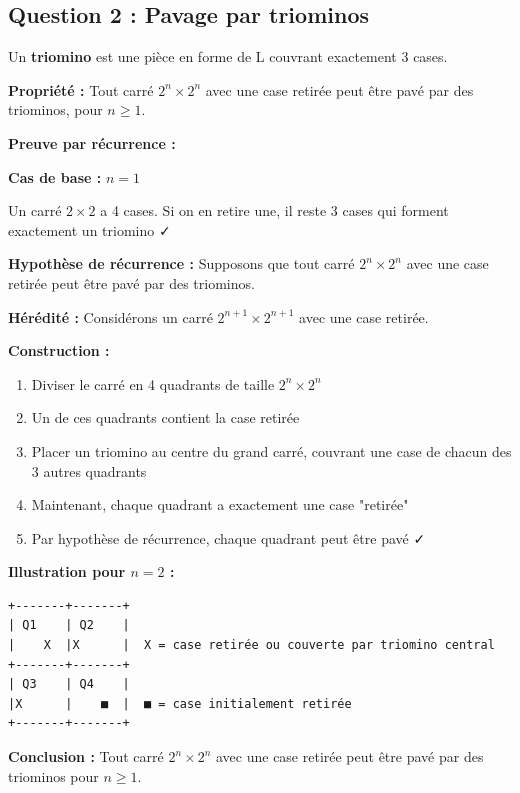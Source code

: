 \documentclass[12pt,a4paper]{article}
\begin{document}
\subsection{Question 2 : Pavage par triominos}

\begin{remarque}
Un \textbf{triomino} est une pièce en forme de L couvrant exactement 3 cases.
\end{remarque}

\begin{demonstration}
\textbf{Propriété :} Tout carré $2^n \times 2^n$ avec une case retirée peut être pavé par des triominos, pour $n \geq 1$.

\textbf{Preuve par récurrence :}

\textbf{Cas de base :} $n = 1$

Un carré $2 \times 2$ a 4 cases. Si on en retire une, il reste 3 cases qui forment exactement un triomino ✓

\textbf{Hypothèse de récurrence :} Supposons que tout carré $2^n \times 2^n$ avec une case retirée peut être pavé par des triominos.

\textbf{Hérédité :} Considérons un carré $2^{n+1} \times 2^{n+1}$ avec une case retirée.

\textbf{Construction :}
\begin{enumerate}
    \item Diviser le carré en 4 quadrants de taille $2^n \times 2^n$
    \item Un de ces quadrants contient la case retirée
    \item Placer un triomino au centre du grand carré, couvrant une case de chacun des 3 autres quadrants
    \item Maintenant, chaque quadrant a exactement une case "retirée"
    \item Par hypothèse de récurrence, chaque quadrant peut être pavé ✓
\end{enumerate}

\textbf{Illustration pour $n=2$ :}
\begin{verbatim}
+-------+-------+
| Q1    | Q2    |
|    X  |X      |  X = case retirée ou couverte par triomino central
+-------+-------+
| Q3    | Q4    |
|X      |    ■  |  ■ = case initialement retirée
+-------+-------+
\end{verbatim}

\textbf{Conclusion :} Tout carré $2^n \times 2^n$ avec une case retirée peut être pavé par des triominos pour $n \geq 1$.
\end{demonstration}
\end{document}
